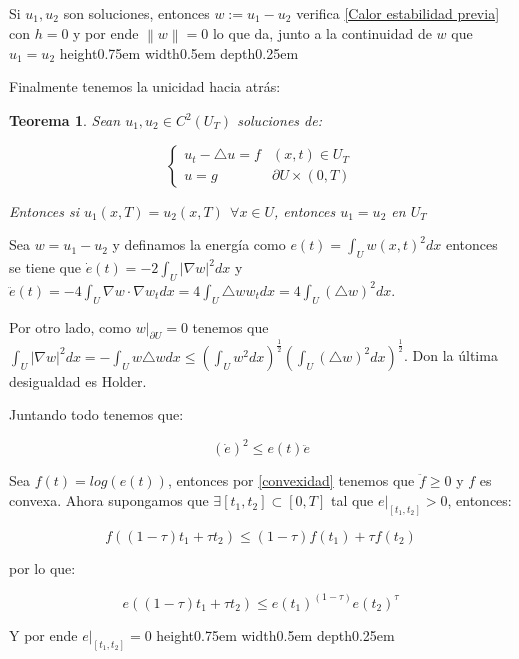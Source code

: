 \documentclass[11pt]{article}
\newcommand\norm[1]{\left\lVert#1\right\rVert}
\newtheorem{theorem}{Teorema}[section]
\newenvironment{proof}[1][Demostraci\'on]{\begin{trivlist}
\item[\hskip \labelsep {\bfseries #1}]}{\end{trivlist}}
\newcommand{\qed}{\nobreak \ifvmode \relax \else
      \ifdim\lastskip<1.5em \hskip-\lastskip
      \hskip1.5em plus0em minus0.5em \fi \nobreak
      \vrule height0.75em width0.5em depth0.25em\fi}
\begin{document}
\begin{proof}
Si $u_1,u_2$ son soluciones, entonces $w := u_1 -u_2$ verifica \ref{Calor estabilidad previa} con $h=0$ y por ende $\norm{w} = 0$ lo que da, junto a la continuidad de $w$ que $u_1 = u_2$ \qed
\end{proof}

Finalmente tenemos la unicidad hacia atr\'as:

\begin{theorem}

Sean $u_1,u_2 \in C^2(U_T)$ soluciones de:

\begin{equation}
\label{Calor unicidad atras}
{
	\left\{
		\begin{array}{ll}
			u_t -  \triangle u = f & (x,t) \in U_T \\
			u = g & \partial U \times (0,T)
		\end{array}
	\right.
}
\end{equation}

Entonces si $u_1(x,T) = u_2(x,T) \ \ \forall x \in U$, entonces $u_1 = u_2 $ en $U_T$

\end{theorem}

\begin{proof}

Sea $w = u_1 - u_2$ y definamos la energ\'ia como $e(t) = \int_{U}{w(x,t)^2 dx}$ entonces se tiene que $\dot{e}(t) = -2 \int_{U}{|\nabla w|^2 dx}$ y $\ddot{e}(t) = -4 \int_{U}{\nabla w \cdot \nabla w_t dx} = 4 \int_{U}{\triangle w w_t dx} = 4 \int_{U}{(\triangle w)^2 dx}$.

Por otro lado, como $w|_{\partial U}=0$ tenemos que $\int_{U}{|\nabla w|^2 dx} = -\int_{U}{w \triangle w dx} \leq (\int_{U}{w^2 dx})^{\frac{1}{2}}(\int_{U}{(\triangle w)^2 dx})^{\frac{1}{2}}$. Don la \'ultima desigualdad es Holder.

Juntando todo tenemos que:


\begin{equation}
\label{convexidad}
{
(\dot{e})^2 \leq e(t) \ddot{e}
}
\end{equation}


Sea $f(t) = log(e(t))$, entonces por \ref{convexidad} tenemos que $\ddot{f} \geq 0$ y $f$ es convexa. Ahora supongamos que $\exists [t_1,t_2] \subset [0,T]$ tal que $e|_{[t_1,t_2]}>0$, entonces:

$$f((1-\tau)t_1 + \tau t_2) \leq (1-\tau)f(t_1) + \tau f(t_2)$$ 

por lo que:

$$ e((1-\tau)t_1 + \tau t_2) \leq e(t_1)^{(1-\tau)}e(t_2)^{\tau} $$

Y por ende $e|_{[t_1,t_2]}=0$\qed
\end{proof}
\end{document}
